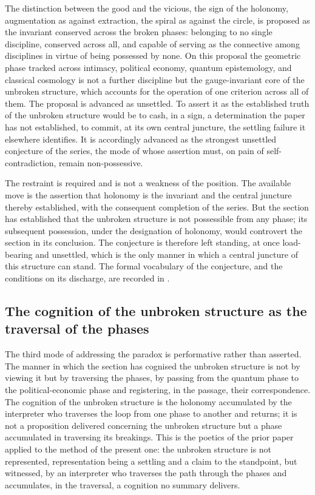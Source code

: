 \begin{claim}
The distinction between the good and the vicious, the sign of the holonomy, augmentation as against extraction, the spiral as against the circle, is proposed as the invariant conserved across the broken phases: belonging to no single discipline, conserved across all, and capable of serving as the connective among disciplines in virtue of being possessed by none. On this proposal the geometric phase tracked across intimacy, political economy, quantum epistemology, and classical cosmology is not a further discipline but the gauge-invariant core of the unbroken structure, which accounts for the operation of one criterion across all of them. The proposal is advanced as unsettled. To assert it as the established truth of the unbroken structure would be to cash, in a sign, a determination the paper has not established, to commit, at its own central juncture, the settling failure it elsewhere identifies. It is accordingly advanced as the strongest unsettled conjecture of the series, the mode of whose assertion must, on pain of self-contradiction, remain non-possessive.
\end{claim}

\noindent
The restraint is required and is not a weakness of the position. The available move is the assertion that holonomy is the invariant and the central juncture thereby established, with the consequent completion of the series. But the section has established that the unbroken structure is not possessible from any phase; its subsequent possession, under the designation of holonomy, would controvert the section in its conclusion. The conjecture is therefore left standing, at once load-bearing and unsettled, which is the only manner in which a central juncture of this structure can stand. The formal vocabulary of the conjecture, and the conditions on its discharge, are recorded in .

\subsection{The cognition of the unbroken structure as the traversal of the phases}
\label{p10:sec:walk}

The third mode of addressing the paradox is performative rather than asserted. The manner in which the section has cognised the unbroken structure is not by viewing it but by traversing the phases, by passing from the quantum phase to the political-economic phase and registering, in the passage, their correspondence. The cognition of the unbroken structure is the holonomy accumulated by the interpreter who traverses the loop from one phase to another and returns; it is not a proposition delivered concerning the unbroken structure but a phase accumulated in traversing its breakings. This is the poetics of the prior paper applied to the method of the present one: the unbroken structure is not represented, representation being a settling and a claim to the standpoint, but witnessed, by an interpreter who traverses the path through the phases and accumulates, in the traversal, a cognition no summary delivers.

